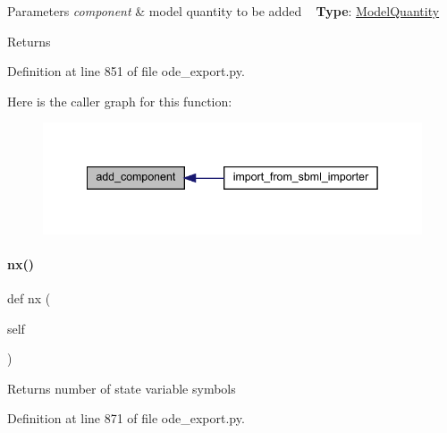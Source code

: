 \begin{DoxyParams}{Parameters}
{\em component} & model quantity to be added ~\newline
{\bfseries Type}\+: \mbox{\hyperlink{classamici_1_1ode__export_1_1_model_quantity}{Model\+Quantity}}\\
\hline
\end{DoxyParams}
\begin{DoxyReturn}{Returns}

\end{DoxyReturn}


Definition at line 851 of file ode\+\_\+export.\+py.

Here is the caller graph for this function\+:
\nopagebreak
\begin{figure}[H]
\begin{center}
\leavevmode
\includegraphics[width=342pt]{classamici_1_1ode__export_1_1_o_d_e_model_a2731bd07d8e64b54d6b455d6d8441f13_icgraph}
\end{center}
\end{figure}
\mbox{\label{classamici_1_1ode__export_1_1_o_d_e_model_a43830bc0d4337068016ab3f290e3cdca}} 
\paragraph{\texorpdfstring{nx()}{nx()}}
{\footnotesize\ttfamily def nx (\begin{DoxyParamCaption}\item[{}]{self }\end{DoxyParamCaption})}

\begin{DoxyReturn}{Returns}
number of state variable symbols 
\end{DoxyReturn}


Definition at line 871 of file ode\+\_\+export.\+py.

